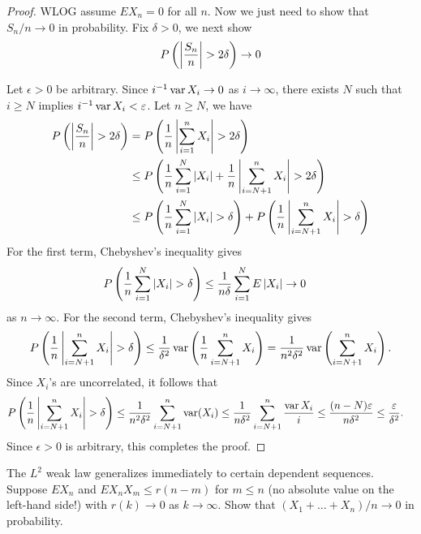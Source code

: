 \documentclass[a4paper]{article}
\begin{document}
\begin{proof}
  WLOG assume $E X_n = 0$ for all $n$. Now we just 
  need to show that $S_n / n \to 0$ in probability. 
  Fix $\delta > 0$, we next show 
  \[
  P \left( \left\lvert \frac{S_n}{n}\right\rvert > 2 \delta \right)
  \to 0
  \]
  
  Let $\epsilon > 0$ be arbitrary. 
  Since $i^{-1} \operatorname{var} X_i \to 0$ as $i \to \infty$,
  there exists $N$ such that $i \geq N$ implies 
  $i^{-1} \operatorname{var} X_i < \varepsilon$. 
  Let $n \geq N$, we have 
  \begin{align*} 
    P \left( \left\lvert \frac{S_n}{n}\right\rvert > 2 \delta \right)
    &= P \left( \frac{1}{n} \left\lvert \sum_{i=1}^n X_i\right\rvert > 2 \delta \right) \\
    &\leq P \left( \frac{1}{n} \sum_{i=1}^N \left\lvert X_i\right\rvert + 
    \frac{1}{n} \left\lvert \sum_{i=N+1}^{n} X_i\right\rvert > 2 \delta \right) \\
    &\leq P \left( \frac{1}{n} \sum_{i=1}^N \left\lvert X_i\right\rvert > 
    \delta \right)
    + P \left( \frac{1}{n} \left\lvert \sum_{i=N + 1}^n X_i\right\rvert > 
    \delta \right)
  \end{align*}
  For the first term, Chebyshev's inequality gives
  \begin{align*}
    P \left( \frac{1}{n} \sum_{i=1}^N \left\lvert X_i\right\rvert > \delta \right)
    &\leq \frac{1}{n \delta} \sum_{i=1}^N E \left\lvert X_i\right\rvert \to 0
  \end{align*}
  as $n \to \infty$.
  For the second term, Chebyshev's inequality gives
  \begin{align*}
    P \left( \frac{1}{n} \left\lvert \sum_{i=N+1}^n X_i\right\rvert > \delta \right)
    \leq \frac{1}{\delta^2} \operatorname{var} \left( \frac{1}{n} \sum_{i=N + 1}^n X_i \right)
    = \frac{1}{n^2 \delta^2} \operatorname{var} \left( \sum_{i=N+1}^n X_i \right).
  \end{align*}
  Since $X_i$'s are uncorrelated, it follows that 
  \begin{align*}
    P \left( \frac{1}{n} \left\lvert \sum_{i=N+1}^n X_i\right\rvert > \delta \right)
    &\leq \frac{1}{n^2 \delta^2} \sum_{i=N + 1}^n \operatorname{var} (X_i) 
    \leq \frac{1}{n \delta^2} \sum_{i=N + 1}^n \frac{\operatorname{var} X_i}{i}
    \leq \frac{(n - N) \varepsilon}{n \delta^2} \leq \frac{\varepsilon}{\delta^2}.
  \end{align*}
  Since $\epsilon > 0$ is arbitrary, this completes the proof.

\end{proof}

\begin{ex}[Durrett 2.2.2]
  The $L^2$ weak law generalizes immediately to certain dependent
  sequences. Suppose $E X_n$ and $E X_n X_m \leq r (n - m)$ for $m \leq n$ (no
  absolute value on the left-hand side!) with $r (k) \to 0$ as $k \to \infty$.
  Show that $(X_1 + \dots + X_n) / n \to 0$ in probability.
\end{ex}
\end{document}
